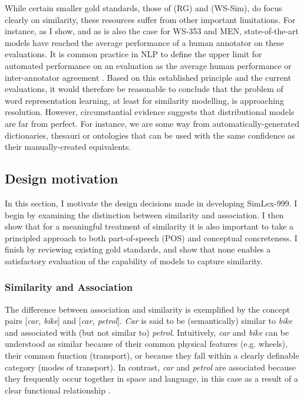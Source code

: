 While certain smaller gold standards, those of \cite{rubenstein1965contextual} (RG) and \cite{agirre2009study} (WS-Sim), do focus clearly on similarity, these resources suffer from other important limitations. For instance, as I show, and as is also the case for WS-353 and MEN, state-of-the-art models have reached the average performance of a human annotator on these evaluations. It is common practice in NLP to define the upper limit for automated performance on an evaluation as the average human performance or inter-annotator agreement \cite{yong1999case,cunningham2005information,resnik201011}. Based on this established principle and the current evaluations, it would therefore be reasonable to conclude that the problem of word representation learning, at least for similarity modelling, is approaching resolution. However, circumstantial evidence suggests that distributional models are far from perfect. For instance, we are some way from automatically-generated dictionaries, thesauri or ontologies that can be used with the same confidence as their manually-created equivalents.   

\subsection{Design motivation}
\label{motivation}

In this section, I motivate the design decisions made in developing SimLex-999. I begin by examining the distinction between similarity and association. I then show that for a meaningful treatment of similarity it is also important to take a principled approach to both part-of-speech (POS) and conceptual concreteness. I finish by reviewing existing gold standards, and show that none enables a satisfactory evaluation of the capability of models to capture similarity.

\subsubsection{Similarity and Association}

The difference between association and similarity is exemplified by the concept pairs [\emph{car, bike}] and [\emph{car, petrol}]. \emph{Car} is said to be (semantically) similar to \emph{bike} and associated with (but not similar to) \emph{petrol}. Intuitively, \emph{car} and \emph{bike} can be understood as similar because of their common physical features (e.g. wheels), their common function (transport), or because they fall within a clearly definable category (modes of transport). In contrast, \emph{car} and \emph{petrol} are associated because they frequently occur together in space and language, in this case as a result of a clear functional relationship \cite{plaut1995semantic,mcrae2012semantic}. 

